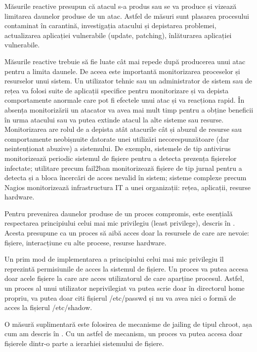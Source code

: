 Măsurile reactive presupun că atacul s-a produs sau se va produce și vizează limitarea daunelor produse de un atac. Astfel de măsuri sunt plasarea procesului contaminat în carantină, investigația atacului și depistarea problemei, actualizarea aplicației vulnerabile (update, patching), înlăturarea aplicației vulnerabile.

Măsurile reactive trebuie să fie luate cât mai repede după producerea unui atac pentru a limita daunele. De aceea este importantă monitorizarea proceselor și resurselor unui sistem. Un utilizator tehnic sau un administrator de sistem sau de rețea va folosi suite de aplicații specifice pentru monitorizare și va depista comportamente anormale care pot fi efectele unui atac și va reacționa rapid. În absența monitorizării un atacator va avea mai mult timp pentru a obține beneficii în urma atacului sau va putea extinde atacul la alte sisteme sau resurse. Monitorizarea are rolul de a depista atât atacurile cât și abuzul de resurse sau comportamente neobișnuite datorate unei utilizări necorespunzătoare (dar neintenționat abuzive) a sistemului. De exemplu, sistemele de tip antivirus monitorizează periodic sistemul de fișiere pentru a detecta prezența fișierelor infectate; utilitare precum fail2ban monitorizează fișiere de tip jurnal pentru a detecta și a bloca încercări de acces nevalid în sistem; sisteme complexe precum Nagios monitorizează infrastructura IT a unei organizații: rețea, aplicații, resurse hardware.

Pentru prevenirea daunelor produse de un proces compromis, este esențială respectarea principiului celui mai mic privilegiu (least privilege), descris în . Acesta presupune ca un proces să aibă acces doar la resursele de care are nevoie: fișiere, interacțiune cu alte procese, resurse hardware.

Un prim mod de implementarea a principiului celui mai mic privilegiu îl reprezintă permisiunile de acces la sistemul de fișiere. Un proces va putea accesa doar acele fișiere la care are acces utilizatorul de care aparține procesul. Astfel, un proces al unui utilizator neprivilegiat va putea scrie doar în directorul home propriu, va putea doar citi fișierul /etc/passwd și nu va avea nici o formă de acces la fișierul /etc/shadow.

O măsură suplimentară este folosirea de mecanisme de jailing de tipul chroot, așa cum am descris în . Cu un astfel de mecanism, un proces va putea accesa doar fișierele dintr-o parte a ierarhiei sistemului de fișiere.

